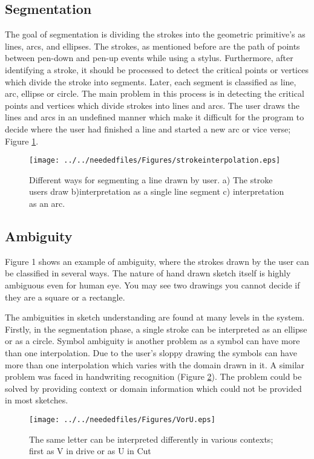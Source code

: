 \subsection {Segmentation}
The goal of segmentation is dividing the strokes into the geometric primitive's as lines, arcs, and ellipses. The strokes, as mentioned before are the path of points between pen-down and pen-up events while using a stylus. Furthermore, after identifying a stroke, it should be processed to detect the critical points or vertices which divide the stroke into segments. Later, each segment is classified as line, arc, ellipse or circle. The main problem in this process is in detecting the critical points and vertices which divide strokes into lines and arcs. The user draws the lines and arcs in an undefined manner which make it difficult for the program to decide where the user had finished a line and started a new arc or vice verse;  Figure \ref {fig:strokeinterpolation}.
\begin{figure}

\begin{center}
		\texttt{[image: ../../neededfiles/Figures/strokeinterpolation.eps]}
	\caption[Segmentation error]{Different ways for segmenting a line drawn by user. a) The stroke users draw b)interpretation as a single line segment c) interpretation as an arc.}
	\label{fig:strokeinterpolation}
\end{center}
\end{figure}

\subsection{Ambiguity}
Figure 1 shows an example of ambiguity, where the strokes drawn by the user can be classified in several ways. The nature of hand drawn sketch itself is highly ambiguous even for human eye. You may see two drawings you cannot decide if they are a square or a rectangle.

The ambiguities in sketch understanding are found at many levels in the system. Firstly, in the segmentation phase, a single stroke can be interpreted as an ellipse or as a circle. Symbol ambiguity is another problem as a symbol can have more than one interpolation. Due to the user's sloppy drawing the symbols can have more than one interpolation which varies with the domain drawn in it. A similar problem was faced in handwriting recognition (Figure \ref{fig:VorU}). The problem could be solved by providing context or domain information which could not be provided in most sketches. 
\begin{figure}	
	\centering
		\texttt{[image: ../../neededfiles/Figures/VorU.eps]}
	\caption[Ambiguities Handwriting] { The same letter can be interpreted differently in various contexts; first as V in drive or as U in Cut}
\label{fig:VorU}
\end{figure} 	

